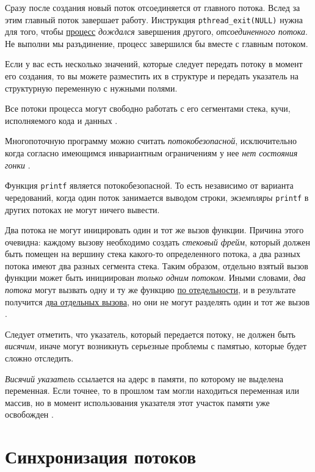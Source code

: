 \documentclass[%
	11pt,
	a4paper,
	utf8,
		]{article}
\begin{document}
Сразу после создания новый поток отсоединяется от главного потока. Вслед за этим главный поток завершает работу. Инструкция \verb|pthread_exit(NULL)| нужна для того, чтобы \underline{процесс} \emph{дождался} завершения другого, \emph{отсоединенного потока}. Не выполни мы разъдинение, процесс завершился бы вместе с главным потоком.

Если у вас есть несколько значений, которые следует передать потоку в момент его создания, то вы можете разместить их в структуре и передать указатель на структурную переменную с нужными полями.

Все потоки процесса могут свободно работать с его сегментами стека, кучи, исполняемого кода и данных \cite[]{amini-extreme-c:2022}.

Многопоточную программу можно считать \emph{потокобезопасной}, исключительно когда согласно имеющимся инвариантным ограничениям у нее \emph{нет состояния гонки} \cite[]{amini-extreme-c:2022}.

Функция \verb|printf| является потокобезопасной. То есть независимо от варианта чередований, когда один поток занимается выводом строки, \emph{экземпляры} \verb|printf| в других потоках не могут ничего вывести.

Два потока не могут иницировать один и тот же вызов функции. Причина этого очевидна: каждому вызову необходимо создать \emph{стековый фрейм}, который должен быть помещен на вершину стека какого-то определенного потока, а два разных потока имеют два разных сегмента стека. Таким образом, отдельно взятый вызов функции может быть инициирован \emph{только одним потоком}. Иными словами, \emph{два потока} могут вызвать одну и ту же функцию \underline{по отедельности}, и в результате получится \underline{два отдельных вызова}, но они {\color{blue}не могут разделять один и тот же вызов} \cite[]{amini-extreme-c:2022}.

Следует отметить, что указатель, который передается потоку, не должен быть \emph{висячим}, иначе могут возникнуть серьезные проблемы с памятью, которые будет сложно отследить.

\emph{Висячий указатель} ссылается на адерс в памяти, по которому не выделена переменная. Если точнее, то в прошлом там могли находиться переменная или массив, но в момент использования указателя этот участок памяти уже освобожден \cite[]{amini-extreme-c:2022}.

\section{Синхронизация потоков}
\end{document}
